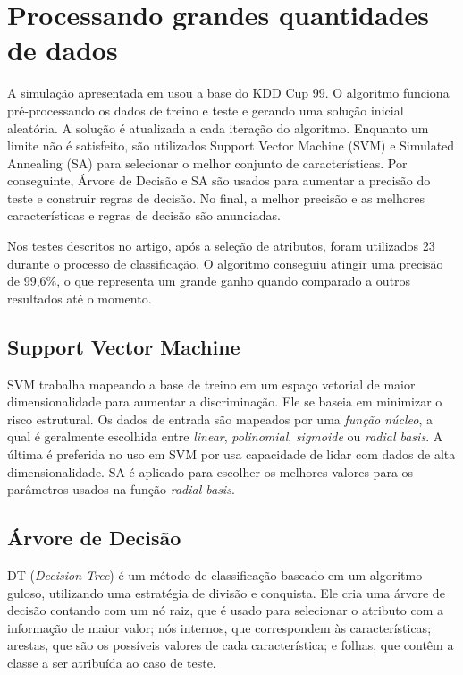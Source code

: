 \section{Processando grandes quantidades de dados}
A simulação apresentada em \cite{lin12} usou a base do KDD Cup 99. O algoritmo funciona pré-processando os dados de treino e teste e gerando uma solução
inicial aleatória. A solução é atualizada a cada iteração do algoritmo. Enquanto um limite não é satisfeito,
são utilizados Support Vector Machine (SVM) e Simulated Annealing (SA) para selecionar o melhor conjunto de
características. Por conseguinte, Árvore de Decisão e SA são usados para aumentar a precisão do teste e construir
regras de decisão. No final, a melhor precisão e as melhores características e regras de decisão são anunciadas.
\par Nos testes descritos no  artigo, após a seleção de atributos, foram utilizados 23 durante o processo de
classificação. O algoritmo conseguiu atingir uma precisão de 99,6\%, o que representa um grande ganho quando comparado
 a outros resultados até o momento.

\subsection{Support Vector Machine}
SVM trabalha mapeando a base de treino em um espaço vetorial de maior dimensionalidade para aumentar a discriminação.
Ele se baseia em minimizar o risco estrutural. Os dados de entrada são mapeados por uma \textit{função núcleo}, a qual
é geralmente escolhida entre \textit{linear}, \textit{polinomial}, \textit{sigmoide} ou \textit{radial basis}. A última
é preferida no uso em SVM por usa capacidade de lidar com dados de alta dimensionalidade. SA é aplicado para escolher
os melhores valores para os parâmetros usados na função \textit{radial basis}.

\subsection{Árvore de Decisão}
DT (\emph{Decision Tree}) é um método de classificação baseado em um algoritmo guloso, utilizando uma estratégia de divisão e conquista. Ele
cria uma árvore de decisão contando com um nó raiz, que é usado para selecionar o atributo com a informação de maior valor;
nós internos, que correspondem às características; arestas, que são os possíveis valores de cada característica; e
folhas, que contêm a classe a ser atribuída ao caso de teste.

